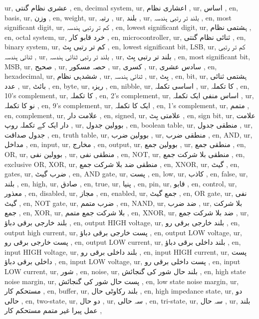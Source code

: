 ur, عشری نظام گنتی  ,
en, decimal system,
ur, اعشاری نظام  ,
ur,  اساس  ,
en, basis,
ur, وزن  ,
en, weight,
ur,  رتبہ  ,
ur,  بلند  ,
ur,  بلند تر رتبی ہندسہ  ,
en, most significant digit,
ur,  کم تر رتبی ہندسہ  ,
en, lowest significant digit,
ur, ہشتمی نظام  ,
en, octal system,
ur, خرد قابو کار  ,
en, microcontroller,
ur,  ثنائی نظام گنتی  ,
en, binary system,
ur, کم تر رتبی بِٹ  ,
en, lowest significant bit, LSB,
ur, کم تر رتبی ثنائی ہندسہ ,
ur, بلند تر رتبی ثنائی ہندسہ  ,
ur, بلند تر رتبی بِٹ  ,
en, most significant bit, MSB,
ur,  صحیح  ,
ur,  حصہ مسکور  ,
ur, کسری  ,
ur,  سادس عشری  ,
en, hexadecimal,
ur,  ششدہی نظام  ,
ur, ثنائی ہندسہ  ,
ur, بِٹ  ,
en, bit,
ur, ہشتمی ثنائی عدد  ,
ur, بائٹ  ,
en, byte,
ur,  ریزہ  ,
en, nibble,
ur, اساسی تکملہ  ,
ur,   کا تکملہ  ,
en, 10's complement,
ur,   کا تکملہ  ,
en, 2's complement,
ur,  اساس منفی ایک تکملہ  ,
ur, نو کا تکملہ ,
en, 9's complement,
ur, ایک کا تکملہ ,
en, 1's complement,
ur,  متمم  ,
en, complement,
ur, علامت دار  ,
en, signed,
ur,  علامتی بِٹ  ,
en, sign bit,
ur,  علامت دار ایک کے تکملہ روپ  ,
ur,  بوولین جدول  ,
en, boolean table,
ur,  منطقی جدول ,
ur, جدول صداقت ,
en, truth table,
ur, بوولین ضرب  ,
ur, منطقی ضرب  ,
en, AND,
ur,  مداخل  ,
en, input,
ur, مخارج  ,
en, output,
ur, بوولین جمع  ,
ur, منطقی جمع ,
en, OR,
ur,  بوولین نفی  ,
ur,  منطقی نفی ,
en, NOT,
ur, منطقی بلا شرکت جمع  ,
en, exclusive OR, XOR,
ur,  منطقی ضد بلا شرکت جمع  ,
en, XNOR,
ur, گیٹ ,
en, gates,
ur, ضرب گیٹ  ,
en, AND gate,
ur, پست  ,
en, low,
ur,  کاذب  ,
en, false,
ur,  بلند  ,
en, high,
ur,  صادق  ,
en, true,
ur,  پنیا  ,
en, pin,
ur, قابو  ,
en, control,
ur,  معذور  ,
en, disabled,
ur, مجاز  ,
en, enabled,
ur,  جمع گیٹ  ,
en, OR gate,
ur, نفی گیٹ  ,
en, NOT gate,
ur,  ضرب متمم  ,
en, NAND,
ur,  ضد ضرب  ,
ur,  بلا شرکت جمع  ,
en, XOR,
ur, بلا شرکت جمع متمم ,
en, XNOR,
ur,  ضد بلا شرکت جمع  ,
ur,  بلند خارجی برقی دباؤ  ,
en, output HIGH voltage,
ur,  بلند خارجی برقی رو  ,
en, output high current,
ur, پست خارجی برقی دباؤ  ,
en, output LOW voltage,
ur, پست خارجی برقی رو  ,
en, output LOW current,
ur, بلند داخلی برقی دباؤ  ,
en, input HIGH voltage,
ur, بلند داخلی برقی رو  ,
en, input HIGH current,
ur,  پست داخلی برقی دباؤ  ,
en, input LOW voltage,
ur,  پست داخلی برقی رو  ,
en, input LOW current,
ur, شور  ,
en, noise,
ur,  بلند حال شور کی گنجائش  ,
en, high state noise margin,
ur,  پست حال شور کی گنجائش  ,
en, low state noise margin,
ur, مستحکم کار  ,
en, buffer,
ur,  بلند رکاوٹی حال  ,
en, high impedance state,
ur,  دو حالی  ,
en, two-state,
ur, دو حال ,
ur, سہ حالی  ,
en, tri-state,
ur,  سہ حال  ,
ur, بلند عمل پیرا غیر متمم مستحکم کار ,
